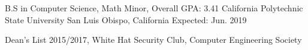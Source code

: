 


\begin{cventries}


\cventry
{B.S in Computer Science, Math Minor, Overall GPA: 3.41} %
{California Polytechnic State University} %
{San Luis Obispo, California} %
{Expected: Jun. 2019} %
{ %
\begin{cvitems}
\item {Dean's List 2015/2017, White Hat Security Club, Computer Engineering Society }
\end{cvitems}
}


\end{cventries}
